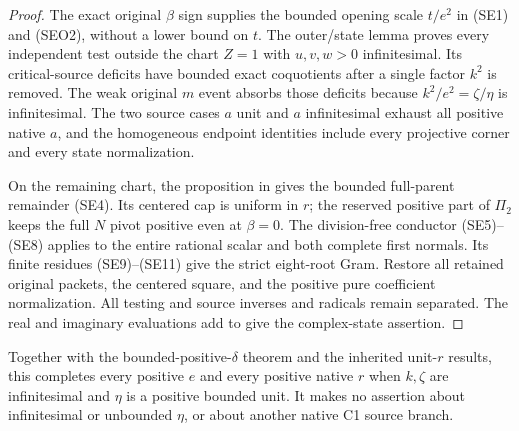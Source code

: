 \begin{proof}
The exact original $\beta$ sign supplies the bounded opening scale
$t/e^2$ in (SE1) and (SEO2), without a lower bound on $t$.
The outer/state lemma  proves every
independent test outside the chart $Z=1$ with $u,v,w>0$ infinitesimal.
Its critical-source deficits have bounded exact coquotients after a
single factor $k^2$ is removed. The weak original $m$ event absorbs
those deficits because $k^2/e^2=\zeta/\eta$ is infinitesimal.
The two source cases $a$ unit and $a$ infinitesimal exhaust all positive
native $a$, and the homogeneous endpoint identities include every
projective corner and every state normalization.

On the remaining chart, the proposition in
 gives the bounded full-parent
remainder (SE4). Its centered cap is uniform in $r$; the reserved
positive part of $\Pi_2$ keeps the full $N$ pivot positive even at
$\beta=0$. The division-free conductor (SE5)--(SE8) applies to the
entire rational scalar and both complete first normals. Its finite
residues (SE9)--(SE11) give the strict eight-root Gram. Restore all
retained original packets, the centered square, and the positive pure
coefficient normalization. All testing and source inverses and radicals
remain separated. The real and imaginary evaluations add to give the
complex-state assertion.
\end{proof}

Together with the bounded-positive-$\delta$ theorem and the inherited
unit-$r$ results, this completes every positive $e$ and every positive
native $r$ when $k,\zeta$ are infinitesimal and $\eta$ is a positive
bounded unit. It makes no assertion about infinitesimal or unbounded
$\eta$, or about another native C1 source branch.
